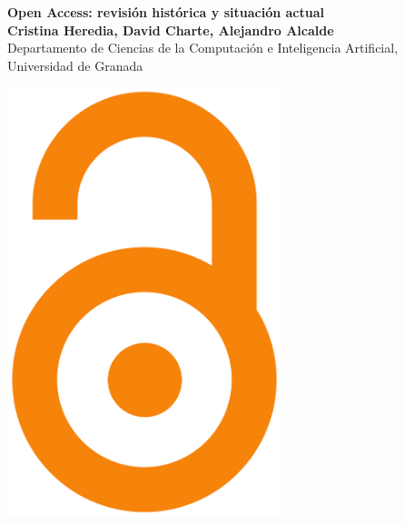 \documentclass[a0,portrait]{a0poster}
\begin{document}


\begin{minipage}[t]{0.7\linewidth}
  \vspace{0pt}
  \flushleft
  \VeryHuge \color{openaccess} \textbf{\sffamily Open Access: revisión histórica y situación actual} \color{Black}
  \\ %

  \vspace{1cm} %
  \large \textbf{Cristina Heredia, David Charte, Alejandro Alcalde}\\[0.5cm] %
  \large Departamento de Ciencias de la Computación e Inteligencia Artificial, Universidad de Granada\\[0.5cm] %
\end{minipage}
\hfill
\begin{minipage}[t]{0.15\textwidth}
  \vspace{0.5em}
  \centering\includegraphics[width=0.60\textwidth]{openaccess_logo.png}
\end{minipage}
%
\vspace{1cm} %
\end{document}
